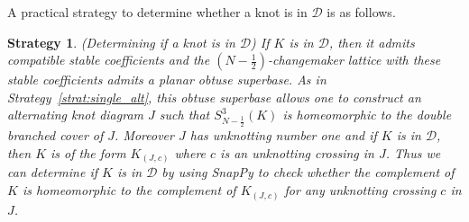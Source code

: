 \documentclass{amsart} %
\newcommand{\D}{\mathcal{D}}
\theoremstyle{thm}
\newtheorem{strat}[Theorem]{Strategy}
\theoremstyle{definition}
\numberwithin{equation}{section}
\begin{document}
A practical strategy to determine whether a knot is in $\D$ is as follows.

\begin{strat}\label{strat:knot_in_D}(Determining if a knot is in $\D$)
 If $K$ is in $\D$, then it admits compatible stable coefficients and the $(N-\frac12)$-changemaker lattice with these stable coefficients admits a planar obtuse superbase. As in Strategy~\ref{strat:single_alt}, this obtuse superbase allows one to construct an alternating knot diagram $J$ such that $S_{N-\frac12}^3(K)$ is homeomorphic to the double branched cover of $J$. Moreover $J$ has unknotting number one and if $K$ is in $\D$, then $K$ is of the form $K_{(J,c)}$ where $c$ is an unknotting crossing in $J$. Thus we can determine if $K$ is in $\D$ by using SnapPy to check whether the complement of $K$ is homeomorphic to the complement of $K_{(J,c)}$ for any unknotting crossing $c$ in $J$.
\end{strat}
\end{document}

